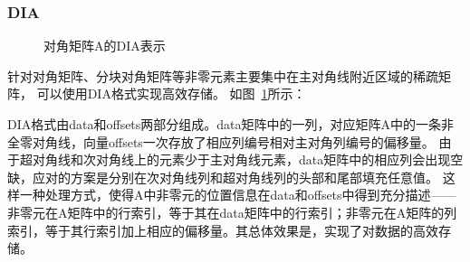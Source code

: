 \documentclass[11pt,twocolumn]{article}
\begin{document}
\subsubsection{DIA}
\begin{figure} 
  \centering 
  \hspace{3in} 
  \caption{对角矩阵A的DIA表示} 
  \label{fig:DIA} %
\end{figure}

针对对角矩阵、分块对角矩阵等非零元素主要集中在主对角线附近区域的稀疏矩阵，
可以使用DIA格式实现高效存储。
如图~\ref{fig:DIA}所示：

DIA格式由data和offsets两部分组成。data矩阵中的一列，对应矩阵A中的一条非全零对角线，向量offsets一次存放了相应列编号相对主对角列编号的偏移量。
由于超对角线和次对角线上的元素少于主对角线元素，data矩阵中的相应列会出现空缺，应对的方案是分别在次对角线列和超对角线列的头部和尾部填充任意值。
这样一种处理方式，使得A中非零元的位置信息在data和offsets中得到充分描述——非零元在A矩阵中的行索引，等于其在data矩阵中的行索引；非零元在A矩阵的列索引，等于其行索引加上相应的偏移量。其总体效果是，实现了对数据的高效存储。
\end{document}
